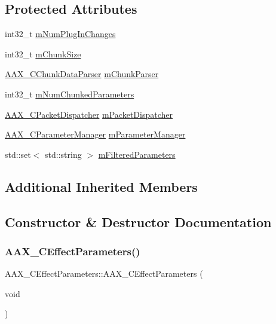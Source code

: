 \subsection*{Protected Attributes}
\begin{DoxyCompactItemize}
\item 
int32\+\_\+t \mbox{\hyperlink{a01481_a1d9f79117c9075f47b00a7af34113b22}{m\+Num\+Plug\+In\+Changes}}
\item 
int32\+\_\+t \mbox{\hyperlink{a01481_a8c792ec58dc073534348004f0c0c09dd}{m\+Chunk\+Size}}
\item 
\mbox{\hyperlink{a01461}{A\+A\+X\+\_\+\+C\+Chunk\+Data\+Parser}} \mbox{\hyperlink{a01481_a71e52a24c8cd8853c768417aa181b41f}{m\+Chunk\+Parser}}
\item 
int32\+\_\+t \mbox{\hyperlink{a01481_ad6a57b4e98161c28b55b250e0234c4ba}{m\+Num\+Chunked\+Parameters}}
\item 
\mbox{\hyperlink{a01529}{A\+A\+X\+\_\+\+C\+Packet\+Dispatcher}} \mbox{\hyperlink{a01481_a1e4a92cdd947d35eb4382f0b5c4c8dae}{m\+Packet\+Dispatcher}}
\item 
\mbox{\hyperlink{a01545}{A\+A\+X\+\_\+\+C\+Parameter\+Manager}} \mbox{\hyperlink{a01481_afbb31a7a131b227ddd8bbd920aafbfb8}{m\+Parameter\+Manager}}
\item 
std\+::set$<$ std\+::string $>$ \mbox{\hyperlink{a01481_a353f5472e4eaefd348f20f9ff07a13a0}{m\+Filtered\+Parameters}}
\end{DoxyCompactItemize}
\subsection*{Additional Inherited Members}


\subsection{Constructor \& Destructor Documentation}
\mbox{\label{a01481_a35be0a247836ce95e3c6d04a3d756a9f}} 
\subsubsection{\texorpdfstring{AAX\_CEffectParameters()}{AAX\_CEffectParameters()}}
{\footnotesize\ttfamily A\+A\+X\+\_\+\+C\+Effect\+Parameters\+::\+A\+A\+X\+\_\+\+C\+Effect\+Parameters (\begin{DoxyParamCaption}\item[{void}]{ }\end{DoxyParamCaption})}

